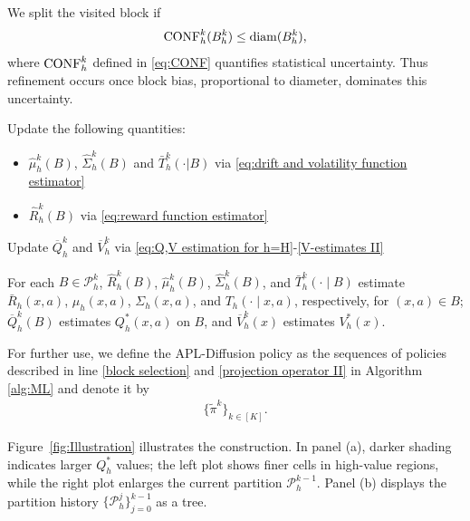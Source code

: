 \documentclass[final,supplement]{siamart251216}
\begin{document}
We split the visited block if
\begin{eqnarray}\label{eq:spliting formula}
    {\rm CONF}_h^k(B_h^k)\leq {\rm diam}(B_h^k),
\end{eqnarray}
where ${\rm CONF}_h^k$ defined in  \eqref{eq:CONF} quantifies statistical uncertainty. Thus refinement occurs once block bias, proportional to diameter, dominates this uncertainty.

\begin{algorithm}[H]
\caption{UPDATE ESTIMATE $(X_h^k,A_h^k,X_{h+1}^k,r_{h}^k,B_h^k)$}\label{alg:ML 3}
\begin{algorithmic}[1]
\State \label{estimators} 
Update the following quantities:
\begin{itemize}
    \item $\widehat{\mu}_h^k(B)$, $\widehat{\Sigma}_h^k(B)$ and $\bar{T}_h^k(\cdot|B)$ via \eqref{eq:drift and volatility function estimator}
    \item $\hat{R}_h^k(B)$ via \eqref{eq:reward function estimator}
\end{itemize}
\State Update $\overline{Q}_h^k$ and $\overline{V}_h^k$ via \eqref{eq:Q,V estimation for h=H}-\eqref{V-estimates II} 
\EndFor
\end{algorithmic}
\end{algorithm}


For each $B\in\mathcal P_h^k$,
$\hat R_h^k(B)$, $\widehat\mu_h^k(B)$, $\widehat\Sigma_h^k(B)$, and
$\bar T_h^k(\cdot\mid B)$ estimate $\bar R_h(x,a)$, $\mu_h(x,a)$,
$\Sigma_h(x,a)$, and $T_h(\cdot\mid x,a)$, respectively, for $(x,a)\in B$;
$\overline Q_h^k(B)$ estimates $Q_h^*(x,a)$ on $B$, and
$\overline V_h^k(x)$ estimates $V_h^*(x)$.


For further use, we define the APL-Diffusion policy as the sequences of policies described in line \ref{block selection} and \ref{projection operator II} in Algorithm \ref{alg:ML} and denote it by 
\begin{eqnarray}\label{our policy}
    \{\tilde{\pi}^{k}\}_{k\in [K]}.
\end{eqnarray}

 Figure~\ref{fig:Illustration} illustrates the construction. In panel (a),
darker shading indicates larger $Q_h^*$ values; the left plot shows finer
cells in high-value regions, while the right plot enlarges the current
partition $\mathcal P_h^{k-1}$. Panel (b) displays the partition history
$\{\mathcal P_h^j\}_{j=0}^{k-1}$ as a tree.
\end{document}
